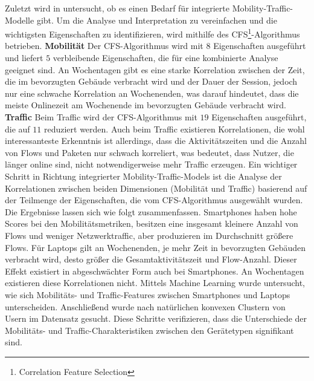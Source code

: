 \documentclass[12pt, a4paper]{article}
\begin{document}
Zuletzt wird in \cite{Alipour2018} untersucht, ob es einen Bedarf für integrierte Mobility-Traffic-Modelle gibt.
Um die Analyse und Interpretation zu vereinfachen und die wichtigsten Eigenschaften zu identifizieren,
wird mithilfe des \textsc{CFS}\footnote{Correlation Feature Selection}-Algorithmus  betrieben. 
\newline\newline
\textbf{Mobilität}\newline
Der \textsc{CFS}-Algorithmus wird mit $8$ Eigenschaften ausgeführt
und liefert $5$ verbleibende Eigenschaften, die für eine kombinierte Analyse geeignet sind.
An Wochentagen gibt es eine starke Korrelation zwischen der Zeit, die im bevorzugten Gebäude 
verbracht wird und der Dauer der Session, jedoch nur eine schwache Korrelation an Wochenenden, was darauf hindeutet,
dass die meiste Onlinezeit am Wochenende im bevorzugten Gebäude verbracht wird.
\newline\newline
\textbf{Traffic}\newline
Beim Traffic wird der \textsc{CFS}-Algorithmus mit $19$ Eigenschaften ausgeführt, die auf $11$
reduziert werden. Auch beim Traffic existieren Korrelationen, die wohl interessanteste Erkenntnis ist allerdings, dass die
Aktivitätszeiten und die Anzahl von Flows und Paketen nur schwach korreliert, was bedeutet, dass Nutzer,
die länger online sind, nicht notwendigerweise mehr Traffic erzeugen.
\newline\newline
Ein wichtiger Schritt in Richtung integrierter Mobility-Traffic-Models ist die Analyse der Korrelationen
zwischen beiden Dimensionen (Mobilität und Traffic) basierend auf der Teilmenge der Eigenschaften,
die vom \textsc{CFS}-Algorithmus ausgewählt wurden.\newline
Die Ergebnisse lassen sich wie folgt zusammenfassen. Smartphones haben hohe Scores bei den Mobilitätsmetriken, besitzen eine
insgesamt kleinere Anzahl von Flows und weniger Netzwerktraffic, aber produzieren im Durchschnitt größere Flows.
Für Laptops gilt an Wochenenden, je mehr Zeit in bevorzugten Gebäuden verbracht wird, desto größer die Gesamtaktivitätszeit
und Flow-Anzahl. Dieser Effekt existiert in abgeschwächter Form auch bei Smartphones. 
An Wochentagen existieren diese Korrelationen nicht.\newline
Mittels Machine Learning wurde untersucht, wie sich Mobilitäts- und Traffic-Features zwischen
Smartphones und Laptops unterscheiden. Anschließend wurde nach natürlichen konvexen Clustern von Usern im
Datensatz gesucht. Diese Schritte verifizieren, dass die Unterschiede der Mobilitäts- und Traffic-Charakteristiken
zwischen den Gerätetypen signifikant sind.
\end{document}
